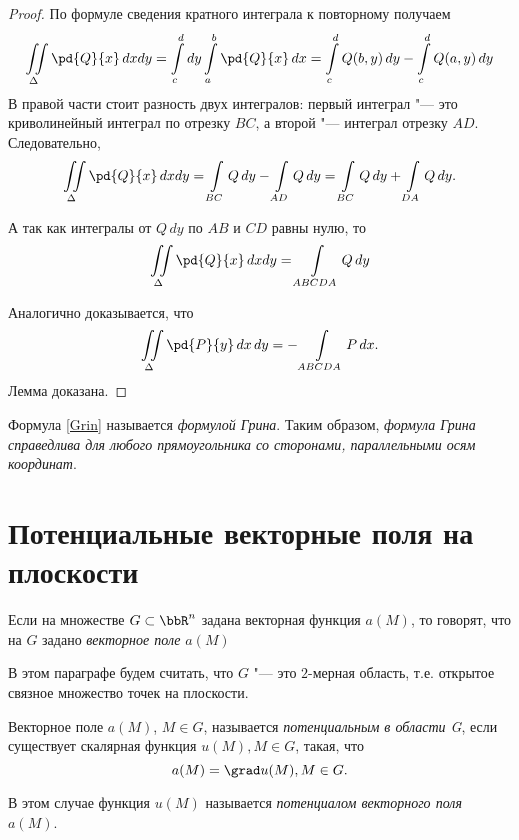 \begin{proof}
По формуле сведения кратного интеграла к повторному получаем
$$
\iint\limits_{\Delta} \pd{Q}{x} \,dxdy = \int_{c}^{d}\limits dy \int_a^b\limits \pd{Q}{x}\,dx = \int_c^d\limits Q(b,y)\,dy - \int_c^d\limits Q(a,y)\,dy
$$
В правой части стоит разность двух интегралов: первый интеграл "--- это криволинейный интеграл по отрезку $BC$, а второй "--- интеграл отрезку $AD$. Следовательно,
$$
\iint\limits_\Delta\pd{Q}{x}\,dxdy = \int_{BC}\limits Q\,dy - \int_{AD}\limits Q\,dy = \int_{BC}\limits Q\,dy + \int_{DA}\limits Q\,dy.
$$

А так как интегралы от $Q\,dy$ по $AB$ и $CD$ равны нулю, то
$$
\iint\limits_\Delta\pd{Q}{x}\,dxdy = \int\limits_{ABCDA} Q\,dy
$$

Аналогично доказывается, что
$$
\iint\limits_\Delta\pd{P}{y}\,dx\,dy = -\int\limits_{ABCDA} P\,dx.  
$$ 
\noindent
Лемма доказана.
\end{proof}
Формула \eqref{Grin} называется \textit{формулой Грина}. Таким образом, \textit{формула Грина справедлива для любого прямоугольника со сторонами, параллельными осям координат}.


\section{Потенциальные векторные поля на плоскости}

Если на множестве $G \subset \bbR^n$ задана векторная функция $a(M)$, то говорят, что на $G$ задано \textit{векторное поле} $a(M)$ 

В этом параграфе будем считать, что $G$ "--- это $2$-мерная область, т.е. открытое связное множество точек на плоскости.

\begin{defn}
Векторное поле $a(M)$, $M\in G$, называется \textit{потенциальным в области G}, если существует скалярная функция $u(M), M\in G$, такая, что 
$$
a(M) = \grad u(M), M \in G.
$$

В этом случае функция $u(M)$ называется \textit{потенциалом векторного поля} $a(M)$.
\end{defn}